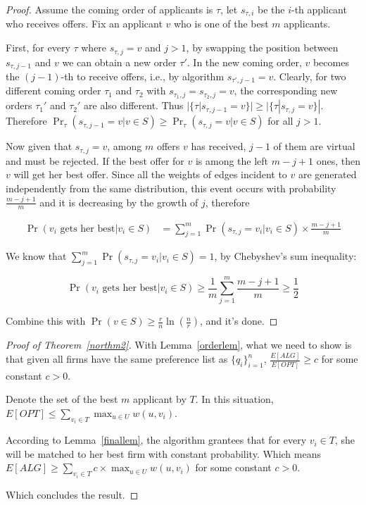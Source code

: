 \begin{proof}
    Assume the coming order of applicants is $\tau$, let
    $s_{\tau, i}$ be the $i$-th applicant who receives offers.
    Fix an applicant $v$ who is one of the best $m$ applicants.

    First, for every $\tau$ where $s_{\tau, j} = v$ and $j > 1$, by swapping the
    position between $s_{\tau, j - 1}$ and $v$ we can obtain a new order $\tau'$.
    In the new coming order, $v$ becomes the $(j-1)$-th to receive offers,
    i.e.,  by algorithm $s_{\tau', j - 1} = v$.
    Clearly, for two different coming order $\tau_1$ and $\tau_2$
    with $s_{\tau_1, j} = s_{\tau_2, j} = v$, the corresponding new orders
    $\tau_1'$ and $\tau_2'$ are also different.
    Thus $|\{\tau | s_{\tau, j-1} = v\}| \geq |\{\tau | s_{\tau, j} = v\}|$.
    Therefore
    $\Pr_{\tau}(s_{\tau, j - 1} = v | v \in S)
    \ge \Pr_{\tau}(s_{\tau, j} = v | v \in S)$ for all $j > 1$.

    Now given that $s_{\tau, j} = v$, among $m$ offers $v$ has
    received, $j - 1$ of them are virtual and must be rejected.
    If the best offer for $v$ is among the left $m - j + 1$ ones, then $v$
    will get her best offer. Since all the weights of edges incident to $v$ are generated
    independently from the same distribution, this event occurs with
    probability $\frac{m - j + 1}{m}$ and it is decreasing by the growth
    of $j$, therefore

    \begin{align*}
        \Pr(v_i\text{ gets her best} | v_i \in S) &= \sum_{j = 1}^{m}
        \Pr(s_{\tau, j} = v_i | v_i \in S) \times \frac{m - j + 1}{m}
    \end{align*}

    We know that $\sum_{j = 1}^{m} \Pr(s_{\tau, j} = v_i | v_i \in S) = 1$,
    by Chebyshev's sum inequality:

    $$\Pr(v_i\text{ gets her best} | v_i \in S) \ge \frac{1}{m} \sum_{j=1}^{m} \frac{m - j + 1}{m} \ge \frac{1}{2} $$

    Combine this with $\Pr(v \in S) \ge \frac{r}{n} \ln(\frac{n}{r})$,
    and it's done.
\end{proof}

\begin{proof}[Proof of Theorem~\ref{northm2}]
    With Lemma~\ref{orderlem}, what we need to show is that
    given all firms have the same preference list as $\{q_i\}_{i=1}^{n}$,
    $\frac{E[ALG]}{E[OPT]} \ge c$ for some constant $c > 0$.

    Denote the set of the best $m$ applicant by $T$.
    In this situation, $E[OPT] \le \sum_{v_i \in T} \max_{u \in U} w(u, v_i)$.
    
    According to Lemma~\ref{finallem}, the algorithm grantees that for every $v_i \in T$,
    she will be matched to her best firm with constant probability.
    Which means $E[ALG] \ge \sum_{v_i \in T} c \times \max_{u \in U} w(u, v_i)$ for some constant $c > 0$.
    
    Which concludes the result.
\end{proof}


